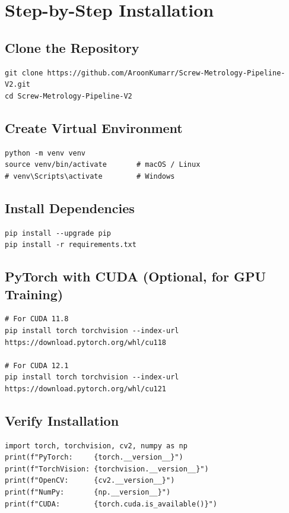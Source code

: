 \documentclass[12pt, a4paper, twoside]{report}
\begin{document}
\section{Step-by-Step Installation}

\subsection{Clone the Repository}
\begin{lstlisting}[style=bashstyle]
git clone https://github.com/AroonKumarr/Screw-Metrology-Pipeline-V2.git
cd Screw-Metrology-Pipeline-V2
\end{lstlisting}

\subsection{Create Virtual Environment}
\begin{lstlisting}[style=bashstyle]
python -m venv venv
source venv/bin/activate       # macOS / Linux
# venv\Scripts\activate        # Windows
\end{lstlisting}

\subsection{Install Dependencies}
\begin{lstlisting}[style=bashstyle]
pip install --upgrade pip
pip install -r requirements.txt
\end{lstlisting}

\subsection{PyTorch with CUDA (Optional, for GPU Training)}
\begin{lstlisting}[style=bashstyle]
# For CUDA 11.8
pip install torch torchvision --index-url https://download.pytorch.org/whl/cu118

# For CUDA 12.1
pip install torch torchvision --index-url https://download.pytorch.org/whl/cu121
\end{lstlisting}

\subsection{Verify Installation}
\begin{lstlisting}[style=pythonstyle]
import torch, torchvision, cv2, numpy as np
print(f"PyTorch:     {torch.__version__}")
print(f"TorchVision: {torchvision.__version__}")
print(f"OpenCV:      {cv2.__version__}")
print(f"NumPy:       {np.__version__}")
print(f"CUDA:        {torch.cuda.is_available()}")
\end{lstlisting}
\end{document}
